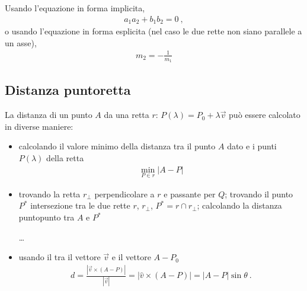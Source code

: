 \documentclass[letterpaper,10pt,italian]{jupyterBook}
\begin{document}
\sphinxAtStartPar
Usando l’equazione in forma implicita,
\begin{equation*}
\begin{split}a_1 a_2 + b_1 b_2 = 0 \ ,\end{split}
\end{equation*}
\sphinxAtStartPar
o usando l’equazione in forma esplicita (nel caso le due rette non siano parallele a un asse),
\begin{equation*}
\begin{split}m_2 = -\frac{1}{m_1}\end{split}
\end{equation*}

\subsection{Distanza punto\sphinxhyphen{}retta}
\label{\detokenize{ch/analytic_geometry/analytic_geometry_2d/lines:distanza-punto-retta}}\label{\detokenize{ch/analytic_geometry/analytic_geometry_2d/lines:geometry-analytic-2d-lines-distance-point-line}}
\sphinxAtStartPar
La distanza di un punto \(A\) da una retta \(r: \, P(\lambda) =  P_0 + \lambda \vec{v}\) può essere calcolato in diverse maniere:
\begin{itemize}
\item {} 
\sphinxAtStartPar
calcolando il valore minimo della distanza tra il punto \(A\) dato e i punti \(P(\lambda)\) della retta
\begin{equation*}
\begin{split}\min_{P \in r} |A - P|\end{split}
\end{equation*}
\item {} 
\sphinxAtStartPar
trovando la retta \(r_{\perp}\) perpendicolare a \(r\) e passante per \(Q\); trovando il punto \(P^*\) intersezione tra le due rette \(r\), \(r_{\perp}\), \(P^* = r \cap r_{\perp}\); calcolando la distanza punto\sphinxhyphen{}punto tra \(A\) e \(P^*\)

\sphinxAtStartPar
…  

\item {} 
\sphinxAtStartPar
usando il  tra il vettore \(\vec{v}\) e il vettore \(A-P_0\)
\begin{equation*}
\begin{split}d = \frac{|\vec{v} \times (A-P)|}{|\vec{v}|} = |\hat{v} \times (A-P)| = |A - P| \sin \theta \ .\end{split}
\end{equation*}
\end{itemize}
\end{document}
